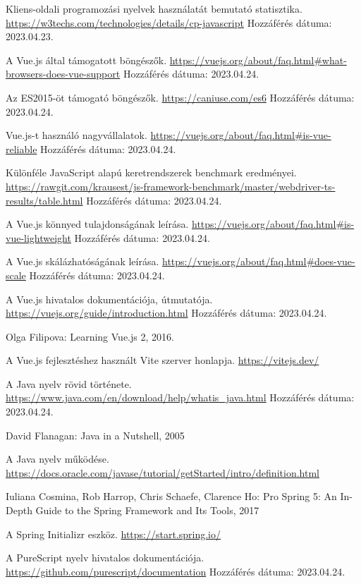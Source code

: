 \documentclass[12pt]{article}
\begin{document}
\begin{thebibliography}{99}
Kliens-oldali programozási nyelvek használatát bemutató statisztika. \url{https://w3techs.com/technologies/details/cp-javascript}  Hozzáférés dátuma: 2023.04.23.

A Vue.js által támogatott böngészők. \url{https://vuejs.org/about/faq.html#what-browsers-does-vue-support} Hozzáférés dátuma: 2023.04.24.

Az ES2015-öt támogató böngészők. \url{https://caniuse.com/es6} Hozzáférés dátuma: 2023.04.24.

Vue.js-t használó nagyvállalatok. \url{https://vuejs.org/about/faq.html#is-vue-reliable} Hozzáférés dátuma: 2023.04.24.

Különféle JavaScript alapú keretrendszerek benchmark eredményei. \url{https://rawgit.com/krausest/js-framework-benchmark/master/webdriver-ts-results/table.html} Hozzáférés dátuma: 2023.04.24.

A Vue.js könnyed tulajdonságának leírása. \url{https://vuejs.org/about/faq.html#is-vue-lightweight} Hozzáférés dátuma: 2023.04.24.

A Vue.js skálázhatóságának leírása. \url{https://vuejs.org/about/faq.html#does-vue-scale} Hozzáférés dátuma: 2023.04.24.

A Vue.js hivatalos dokumentációja, útmutatója. \url{https://vuejs.org/guide/introduction.html} Hozzáférés dátuma: 2023.04.24.

Olga Filipova: Learning Vue.js 2, 2016.

A Vue.js fejlesztéshez használt Vite szerver honlapja. \url{https://vitejs.dev/}

A Java nyelv rövid története. \url{https://www.java.com/en/download/help/whatis_java.html} Hozzáférés dátuma: 2023.04.24.

David Flanagan: Java in a Nutshell, 2005

A Java nyelv működése. \url{https://docs.oracle.com/javase/tutorial/getStarted/intro/definition.html}

Iuliana Cosmina, Rob Harrop, Chris Schaefe, Clarence Ho: Pro Spring 5: An In-Depth Guide to the Spring Framework and Its Tools, 2017

A Spring Initializr eszköz. \url{https://start.spring.io/}

A PureScript nyelv hivatalos dokumentációja.
\url{https://github.com/purescript/documentation} Hozzáférés dátuma: 2023.04.24.


\end{thebibliography}
\end{document}
